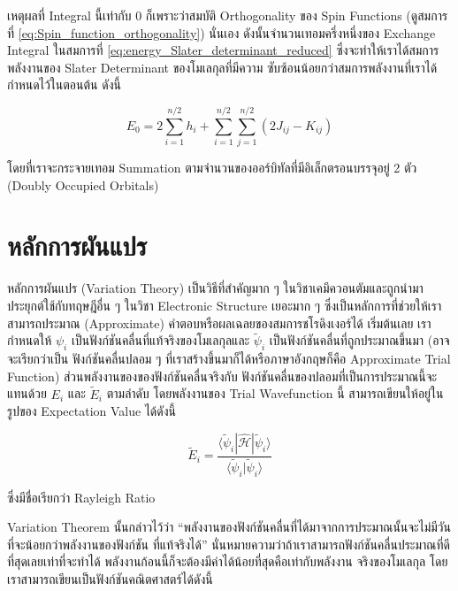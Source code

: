 \noindent เหตุผลที่ Integral นี้เท่ากับ 0 ก็เพราะว่าสมบัติ Orthogonality ของ Spin Functions
(ดูสมการที่ \ref{eq:Spin_function_orthogonality}) นั่นเอง ดังนั้นจำนวนเทอมครึ่งหนึ่งของ Exchange Integral ในสมการที่
\ref{eq:energy_Slater_determinant_reduced} ซึ่งจะทำให้เราได้สมการพลังงานของ Slater Determinant ของโมเลกุลที่มีความ%
ซับซ้อนน้อยกว่าสมการพลังงานที่เราได้กำหนดไว้ในตอนต้น ดังนี้

\begin{equation}
    E_0
    =
    2 \sum_{i=1}^{n / 2} h_i
    + \sum_{i=1}^{n / 2}
    \sum_{j=1}^{n / 2}
    \left(2 J_{i j} - K_{i j}\right)
\end{equation}

\noindent โดยที่เราจะกระจายเทอม Summation ตามจำนวนของออร์บิทัลที่มีอิเล็กตรอนบรรจุอยู่ 2 ตัว (Doubly Occupied Orbitals)

\section{หลักการผันแปร}

หลักการผันแปร (Variation Theory) เป็นวิธีที่สำคัญมาก ๆ ในวิชาเคมึควอนตัมและถูกนำมาประยุกต์ใช้กับทฤษฎีอื่น ๆ ในวิชา Electronic
Structure เยอะมาก ๆ ซึ่งเป็นหลักการที่ช่วยให้เราสามารถประมาณ (Approximate) คำตอบหรือผลเฉลยของสมการชโรดิงเงอร์ได้ เริ่มต้นเลย%
เรากำหนดให้ $\psi_i$ เป็นฟังก์ชันคลื่นที่แท้จริงของโมเลกุลและ $\tilde{\psi}_i$ เป็นฟังก์ชันคลื่นที่ถูกประมาณขึ้นมา (อาจจะเรียกว่าเป็น%
ฟังก์ชันคลื่นปลอม ๆ ที่เราสร้างขึ้นมาก็ได้หรือภาษาอังกฤษก็คือ Approximate Trial Function) ส่วนพลังงานของของฟังก์ชันคลื่นจริงกับ%
ฟังก์ชันคลื่นของปลอมที่เป็นการประมาณนี้จะแทนด้วย $E_i$ และ $\tilde{E}_i$ ตามลำดับ โดยพลังงานของ Trial Wavefunction นี้%
สามารถเขียนให้อยู่ในรูปของ Expectation Value ได้ดังนี้

\begin{equation}
    \label{eq:Rayleigh_ratio}
    \tilde{E}_i
    =
    \frac
    {
        \langle
        \tilde{\psi}_i | \hat{\mathscr{H}} | \tilde{\psi}_i
        \rangle
    }
    {
        \langle
        \tilde{\psi}_i | \tilde{\psi}_i
        \rangle
    }
\end{equation}

\noindent ซึ่งมีชื่อเรียกว่า Rayleigh Ratio

Variation Theorem นั้นกล่าวไว้ว่า \enquote{พลังงานของฟังก์ชันคลื่นที่ได้มาจากการประมาณนั้นจะไม่มีวันที่จะน้อยกว่าพลังงานของฟังก์ชัน%
    ที่แท้จริงได้} นั่นหมายความว่าถ้าเราสามารถฟังก์ชันคลื่นประมาณที่ดีที่สุดเลยเท่าที่จะทำได้ พลังงานก้อนนี้ก็จะต้องมีค่าได้น้อยที่สุดคือเท่ากับพลังงาน%
จริงของโมเลกุล โดยเราสามารถเขียนเป็นฟังก์ชันคณิตศาสตร์ได้ดังนี้

